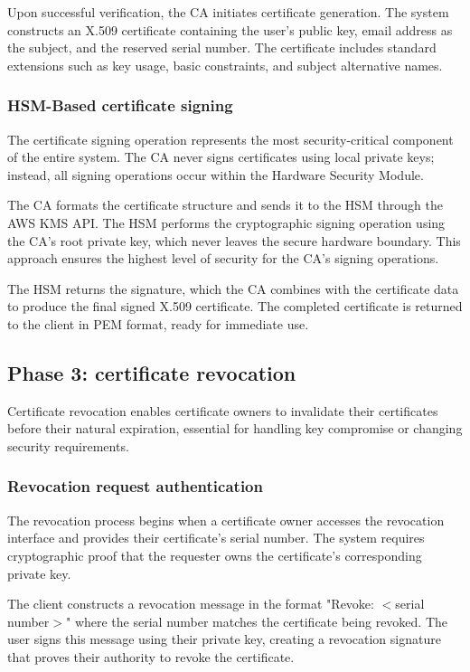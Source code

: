 Upon successful verification, the CA initiates certificate generation. The system 
constructs an X.509 certificate containing the user's public key, email address 
as the subject, and the reserved serial number. The certificate includes standard 
extensions such as key usage, basic constraints, and subject alternative names.

\subsubsection{HSM-Based certificate signing}

The certificate signing operation represents the most security-critical component 
of the entire system. The CA never signs certificates using local private keys; 
instead, all signing operations occur within the Hardware Security Module.

The CA formats the certificate structure and sends it to the HSM through the 
AWS KMS API. The HSM performs the cryptographic signing operation using the 
CA's root private key, which never leaves the secure hardware boundary. This 
approach ensures the highest level of security for the CA's signing operations.

The HSM returns the signature, which the CA combines with the certificate data 
to produce the final signed X.509 certificate. The completed certificate is 
returned to the client in PEM format, ready for immediate use.

\subsection{Phase 3: certificate revocation}

Certificate revocation enables certificate owners to invalidate their certificates 
before their natural expiration, essential for handling key compromise or 
changing security requirements.

\subsubsection{Revocation request authentication}

The revocation process begins when a certificate owner accesses the revocation 
interface and provides their certificate's serial number. The system requires 
cryptographic proof that the requester owns the certificate's corresponding 
private key.

The client constructs a revocation message in the format "Revoke: $<$serial number$>$" 
where the serial number matches the certificate being revoked. The user signs 
this message using their private key, creating a revocation signature that 
proves their authority to revoke the certificate.

